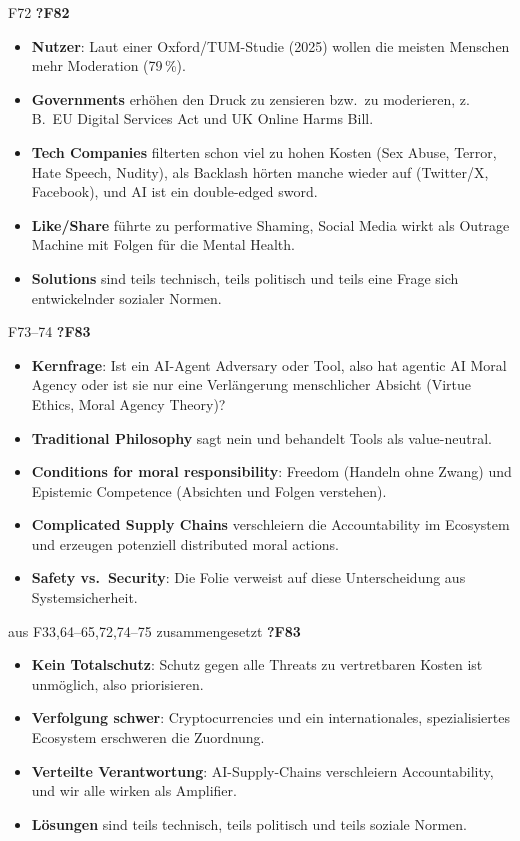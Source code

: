 \documentclass[10pt,a4paper]{article}
\newcommand{\block}[2]{\par\vspace{3pt}{\bfseries #1}\hfill{\scriptsize #2}\par\nopagebreak}
\begin{document}
\block{Social Media und Content Moderation}{F72 \quad \textbf{?F82}}
\begin{itemize}
\item \textbf{Nutzer}: Laut einer Oxford/TUM-Studie (2025) wollen die meisten Menschen mehr Moderation (79\,\%).
\item \textbf{Governments} erhöhen den Druck zu zensieren bzw.\ zu moderieren, z.\,B.\ EU Digital Services Act und UK Online Harms Bill.
\item \textbf{Tech Companies} filterten schon viel zu hohen Kosten (Sex Abuse, Terror, Hate Speech, Nudity), als Backlash hörten manche wieder auf (Twitter/X, Facebook), und AI ist ein double-edged sword.
\item \textbf{Like/Share} führte zu performative Shaming, Social Media wirkt als Outrage Machine mit Folgen für die Mental Health.
\item \textbf{Solutions} sind teils technisch, teils politisch und teils eine Frage sich entwickelnder sozialer Normen.
\end{itemize}
\block{AI-Agents: Tool or Actor?}{F73--74 \quad \textbf{?F83}}
\begin{itemize}
\item \textbf{Kernfrage}: Ist ein AI-Agent Adversary oder Tool, also hat agentic AI Moral Agency oder ist sie nur eine Verlängerung menschlicher Absicht (Virtue Ethics, Moral Agency Theory)?
\item \textbf{Traditional Philosophy} sagt nein und behandelt Tools als value-neutral.
\item \textbf{Conditions for moral responsibility}: Freedom (Handeln ohne Zwang) und Epistemic Competence (Absichten und Folgen verstehen).
\item \textbf{Complicated Supply Chains} verschleiern die Accountability im Ecosystem und erzeugen potenziell distributed moral actions.
\item \textbf{Safety vs.\ Security}: Die Folie verweist auf diese Unterscheidung aus Systemsicherheit.
\end{itemize}
\block{Querschnittsfrage: Online Threats erkennen und bekämpfen}{aus F33,64--65,72,74--75 zusammengesetzt \quad \textbf{?F83}}
\begin{itemize}
\item \textbf{Kein Totalschutz}: Schutz gegen alle Threats zu vertretbaren Kosten ist unmöglich, also priorisieren.
\item \textbf{Verfolgung schwer}: Cryptocurrencies und ein internationales, spezialisiertes Ecosystem erschweren die Zuordnung.
\item \textbf{Verteilte Verantwortung}: AI-Supply-Chains verschleiern Accountability, und wir alle wirken als Amplifier.
\item \textbf{Lösungen} sind teils technisch, teils politisch und teils soziale Normen.
\end{itemize}
\end{document}
